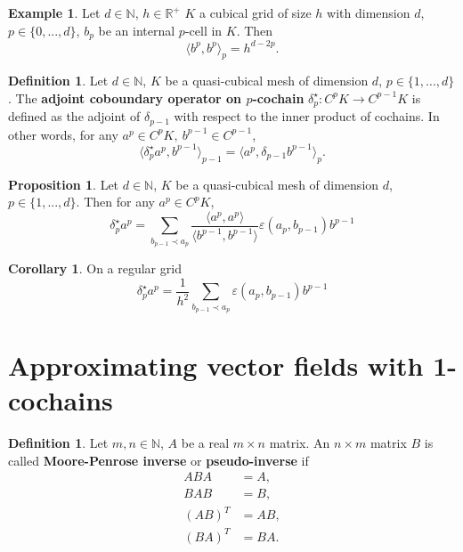 \documentclass[fleqn]{article}
\theoremstyle{definition}
\newtheorem{proposition}[theorem]{Proposition}
\newtheorem{corollary}[theorem]{Corollary}
\newtheorem{definition}[theorem]{Definition}
\newtheorem{example}[theorem]{Example}
\newcommand{\N}{\mathbb{N}}
\newcommand{\R}{\mathbb{R}}
\newcommand{\inner}[2]{\langle#1,#2\rangle}
\begin{document}
\begin{example}
  Let
    $d \in \N$,
    $h \in \R^+$
    $K$ a cubical grid of size $h$ with dimension $d$,
    $p \in \{0, ..., d\}$,
    $b_p$ be an internal $p$-cell in $K$.
  Then
  \begin{equation}
    \inner{b^p}{b^p}_p = h^{d - 2 p}.
  \end{equation}
\end{example}

\begin{definition}
  Let
    $d \in \N$,
    $K$ be a quasi-cubical mesh of dimension $d$,
    $p \in \{1, ..., d\}$.
  The \textbf{adjoint coboundary operator on $p$-cochain}
  $\delta_p^\star \colon C^p K \to C^{p - 1} K$
  is defined as the adjoint of $\delta_{p - 1}$
  with respect to the inner product of cochains.
  In other words, for any $a^p \in C^p K,\ b^{p - 1} \in C^{p - 1}$,
  \begin{equation}
    \inner{\delta_p^\star a^p}{b^{p - 1}}_{p - 1}
    = \inner{a^p}{\delta_{p - 1} b^{p - 1}}_p.
  \end{equation}
\end{definition}

\begin{proposition}
  Let
    $d \in \N$,
    $K$ be a quasi-cubical mesh of dimension $d$,
    $p \in \{1, ..., d\}$.
  Then for any $a^p \in C^p K$,
  \begin{equation}
    \delta^\star_p a^p =
    \sum_{b_{p - 1} \prec a_p}
      \frac
      {\inner{a^p}{a^p}}
      {\inner{b^{p - 1}}{b^{p - 1}}}
      \varepsilon(a_p, b_{p - 1})
      b^{p - 1}
  \end{equation}
\end{proposition}

\begin{corollary}
  On a regular grid
  \begin{equation}
    \delta^\star_p a^p =
    \frac{1}{h^2}
    \sum_{b_{p - 1} \prec a_p}
      \varepsilon(a_p, b_{p - 1})
      b^{p - 1}
  \end{equation}
\end{corollary}

\section{Approximating vector fields with 1-cochains}

\begin{definition}
  Let $m, n \in \N$, $A$ be a real $m \times n$ matrix.
  An $n \times m$ matrix $B$ is called \textbf{Moore-Penrose inverse} or
  \textbf{pseudo-inverse} if
  \begin{subequations}
    \begin{align}
      A B A & = A, \\
      B A B & = B, \\
      (A B)^T & = A B, \\
      (B A)^T & = B A.
    \end{align}
  \end{subequations}
\end{definition}
\end{document}
